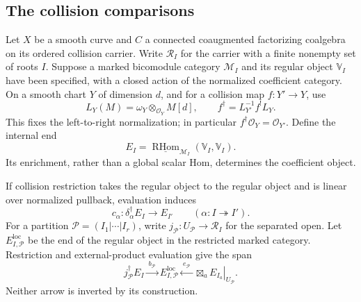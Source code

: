 \subsection{The collision comparisons}

Let \(X\) be a smooth curve and \(C\) a connected
coaugmented factorizing coalgebra on its ordered collision
carrier. Write \(\mathscr R_I\) for the carrier with a finite
nonempty set of roots \(I\). Suppose
a marked bicomodule category \(\mathcal M_I\) and its
regular object \(\mathbb V_I\) have been specified, with
a closed action of the normalized coefficient category.
On a smooth chart \(Y\) of dimension \(d\), and for a
collision map \(f:Y'\to Y\), use
\[
 L_Y(M)=\omega_Y\otimes_{\mathcal O_Y}M[d],\qquad
 f^\dagger=L_{Y'}^{-1}f^!L_Y.
\]
This fixes the left-to-right normalization; in particular
\(f^\dagger\mathcal O_Y=\mathcal O_{Y'}\).
Define the internal end
\[
 E_I=\underline{\operatorname{RHom}}_{\mathcal M_I}
                   (\mathbb V_I,\mathbb V_I).
\]
Its enrichment, rather than a global scalar Hom, determines
the coefficient object.

If collision restriction takes the regular object to the
regular object and is linear over normalized pullback,
evaluation induces
\begin{equation}\label{eq:vol2-root-collision-end-map}
 c_\alpha:\delta_\alpha^\dagger E_I\longrightarrow E_{I'}
 \qquad(\alpha:I\twoheadrightarrow I').
\end{equation}
For a partition \(\mathcal P=(I_1|\cdots|I_r)\), write
\(j_{\mathcal P}:U_{\mathcal P}\to\mathscr R_I\) for the
separated open. Let \(E_{I,\mathcal P}^{\mathrm{loc}}\)
be the end of the regular object in the restricted marked
category. Restriction and external-product evaluation give
the span
\begin{equation}\label{eq:vol2-separated-end-span}
 j_{\mathcal P}^\dagger E_I
 \xrightarrow{\ b_{\mathcal P}\ }E_{I,\mathcal P}^{\mathrm{loc}}
 \xleftarrow{\ e_{\mathcal P}\ }
 \left.\boxtimes_a E_{I_a}\right|_{U_{\mathcal P}}.
\end{equation}
Neither arrow is inverted by its construction.


